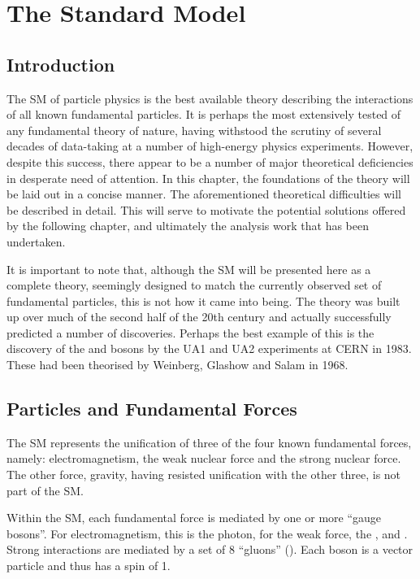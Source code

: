 \chapter{The Standard Model}
\label{sec:sm}
\section{Introduction}
The \acl{SM} of particle physics is the best available theory describing the
interactions of all known fundamental particles. It is perhaps the most
extensively tested of any fundamental theory of nature, having withstood the
scrutiny of several decades of data-taking at a number of high-energy physics
experiments. However, despite this success, there appear to be a number of major
theoretical deficiencies in desperate need of attention. In this chapter, the
foundations of the theory will be laid out in a concise manner. The
aforementioned theoretical difficulties will be described in detail. This will
serve to motivate the potential solutions offered by the following chapter, and
ultimately the analysis work that has been undertaken.

It is important to note that, although the \ac{SM} will be presented here as a
complete theory, seemingly designed to match the currently observed set of
fundamental particles, this is not how it came into being. The theory was built
up over much of the second half of the 20th century and actually successfully
predicted a number of discoveries. Perhaps the best example of this is the
discovery of the \PW and \PZ bosons by the UA1 and UA2 experiments at \ac{CERN}
in 1983. These had been theorised by Weinberg, Glashow and Salam in 1968.

\section{Particles and Fundamental Forces}
\label{sec:theory:particles}
The \ac{SM} represents the unification of three of the four known fundamental
forces, namely: electromagnetism, the weak nuclear force and the strong nuclear
force. The other force, gravity, having resisted unification with the other
three, is not part of the \ac{SM}.

Within the \ac{SM}, each fundamental force is mediated by one or more ``gauge
bosons''. For electromagnetism, this is the photon, for the weak force, the
\PWp, \PWm and \PZ. Strong interactions are mediated by a set of 8 ``gluons''
(\Pg). Each boson is a vector particle and thus has a spin of 1.

